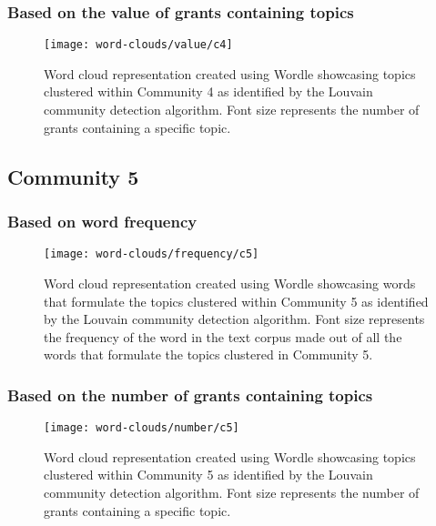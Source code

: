 \clearpage

\subsubsection{Based on the value of grants containing topics}

\begin{figure}[htbp]
    \centering
    \texttt{[image: word-clouds/value/c4]}
    \caption[Word cloud representation based on the value of grants containing topics clustered within Community 4]{Word cloud representation created using Wordle showcasing topics clustered within Community 4 as identified by the Louvain community detection algorithm. Font size represents the number of grants containing a specific topic.}
    \label{fig:topic_grant_value_c4}
\end{figure}

\subsection{Community 5}

\subsubsection{Based on word frequency}

\begin{figure}[htbp]
    \centering
    \texttt{[image: word-clouds/frequency/c5]}
    \caption[Word cloud representation based on word frequency showcasing words that formulate the topics clustered within Community 5]{Word cloud representation created using Wordle showcasing words that formulate the topics clustered within Community 5 as identified by the Louvain community detection algorithm. Font size represents the frequency of the word in the text corpus made out of all the words that formulate the topics clustered in Community 5.}
    \label{fig:topic_grant_freq_c5}
\end{figure}

\clearpage

\subsubsection{Based on the number of grants containing topics}

\begin{figure}[htbp]
    \centering
    \texttt{[image: word-clouds/number/c5]}
    \caption[Word cloud representation based on the number of grants containing topics clustered within Community 5]{Word cloud representation created using Wordle showcasing topics clustered within Community 5 as identified by the Louvain community detection algorithm. Font size represents the number of grants containing a specific topic.}
    \label{fig:topic_grant_number_c5}
\end{figure}

